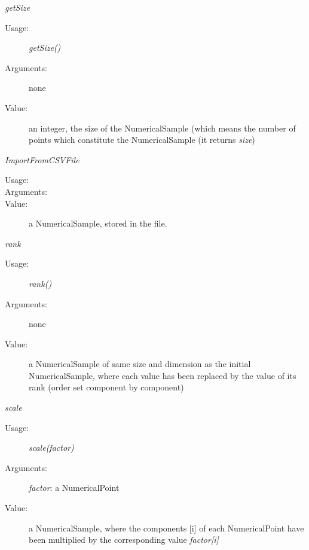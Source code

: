 \begin{description}
\begin{description}
\item \textit{getSize}
\begin{description}
\item[Usage:] \textit{getSize()}
\item[Arguments:] none
\item[Value:] an integer, the size of the NumericalSample (which means the number of points which constitute the NumericalSample (it returns \textit{size})
\end{description}
\bigskip

\item \textit{ImportFromCSVFile}
\begin{description}
\item[Usage:]
\item[Arguments:]
\item[Value:] a NumericalSample, stored in the file.
\end{description}
\bigskip

\item \textit{rank}
\begin{description}
\item[Usage:] \textit{rank()}
\item[Arguments:] none
\item[Value:] a NumericalSample  of same size and dimension as the initial NumericalSample, where each value has been replaced by the value of its rank (order set component by component)
\end{description}
\bigskip

\item \textit{scale}
\begin{description}
\item[Usage:] \textit{scale(factor)}
\item[Arguments:] \textit{factor}: a NumericalPoint
\item[Value:] a NumericalSample, where the components [i] of each NumericalPoint have been multiplied by the corresponding value \textit{factor[i]}
\end{description}
\bigskip


\end{description}
\end{description}
